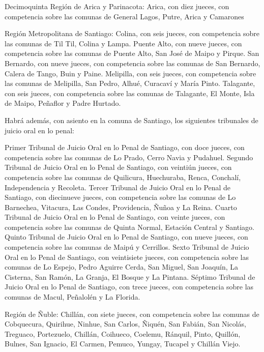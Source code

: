     Decimoquinta Región de Arica y Parinacota:
    Arica, con diez jueces, con competencia sobre las comunas de General Lagos, Putre, Arica y Camarones

    Región Metropolitana de Santiago:
    Colina, con seis jueces, con competencia sobre las comunas de Til Til, Colina y Lampa.
    Puente Alto, con nueve jueces, con competencia sobre las comunas de Puente Alto, San José de Maipo y Pirque.
    San Bernardo, con nueve jueces, con competencia sobre las comunas de San Bernardo, Calera de Tango, Buin y Paine.
    Melipilla, con seis jueces, con competencia sobre las comunas de Melipilla, San Pedro, Alhué, Curacaví y María Pinto.
    Talagante, con seis jueces, con competencia sobre las comunas de Talagante, El Monte, Isla de Maipo, Peñaflor y Padre Hurtado.

    Habrá además, con asiento en la comuna de Santiago, los siguientes tribunales de juicio oral en lo penal:

    Primer Tribunal de Juicio Oral en lo Penal de Santiago, con doce jueces, con competencia sobre las comunas de Lo Prado, Cerro Navia y Pudahuel.
    Segundo Tribunal de Juicio Oral en lo Penal de Santiago, con veintiún jueces, con competencia sobre las comunas de Quilicura, Huechuraba, Renca, Conchalí, Independencia y Recoleta.
    Tercer Tribunal de Juicio Oral en lo Penal de Santiago, con diecinueve jueces, con competencia sobre las comunas de Lo Barnechea, Vitacura, Las Condes, Providencia, Ñuñoa y La Reina.
    Cuarto Tribunal de Juicio Oral en lo Penal de Santiago, con veinte jueces, con competencia sobre las comunas de Quinta Normal, Estación Central y Santiago.
    Quinto Tribunal de Juicio Oral en lo Penal de Santiago, con nueve jueces, con competencia sobre las comunas de Maipú y Cerrillos.
    Sexto Tribunal de Juicio Oral en lo Penal de Santiago, con veintisiete jueces, con competencia sobre las comunas de Lo Espejo, Pedro Aguirre Cerda, San Miguel, San Joaquín, La Cisterna, San Ramón, La Granja, El Bosque y La Pintana.
    Séptimo Tribunal de Juicio Oral en lo Penal de Santiago, con trece jueces, con competencia sobre las comunas de Macul, Peñalolén y La Florida.

    Región de Ñuble:
    Chillán, con siete jueces, con competencia sobre las comunas de Cobquecura, Quirihue, Ninhue, San Carlos, Ñiquén, San Fabián, San Nicolás, Treguaco, Portezuelo, Chillán, Coihueco, Coelemu, Ránquil, Pinto, Quillón, Bulnes, San Ignacio, El Carmen, Pemuco, Yungay, Tucapel y Chillán Viejo.

